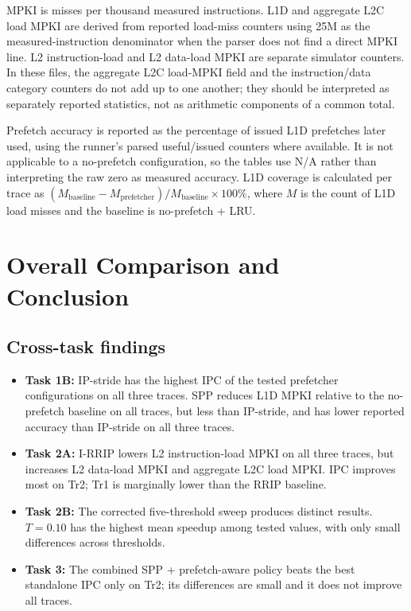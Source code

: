 \documentclass[11pt]{article}
\begin{document}
MPKI is misses per thousand measured instructions. L1D and aggregate L2C load MPKI are derived from reported load-miss counters using 25M as the measured-instruction denominator when the parser does not find a direct MPKI line. L2 instruction-load and L2 data-load MPKI are separate simulator counters. In these files, the aggregate L2C load-MPKI field and the instruction/data category counters do not add up to one another; they should be interpreted as separately reported statistics, not as arithmetic components of a common total.

Prefetch accuracy is reported as the percentage of issued L1D prefetches later used, using the runner's parsed useful/issued counters where available. It is not applicable to a no-prefetch configuration, so the tables use N/A rather than interpreting the raw zero as measured accuracy. L1D coverage is calculated per trace as $(M_{\mathrm{baseline}}-M_{\mathrm{prefetcher}})/M_{\mathrm{baseline}}\times100\%$, where $M$ is the count of L1D load misses and the baseline is no-prefetch + LRU.

\newpage
\newpage
\newpage
\newpage
\newpage
\newpage
\section{Overall Comparison and Conclusion}
\subsection{Cross-task findings}
\begin{itemize}
\item \textbf{Task 1B:} IP-stride has the highest IPC of the tested prefetcher configurations on all three traces. SPP reduces L1D MPKI relative to the no-prefetch baseline on all traces, but less than IP-stride, and has lower reported accuracy than IP-stride on all three traces.
\item \textbf{Task 2A:} I-RRIP lowers L2 instruction-load MPKI on all three traces, but increases L2 data-load MPKI and aggregate L2C load MPKI. IPC improves most on Tr2; Tr1 is marginally lower than the RRIP baseline.
\item \textbf{Task 2B:} The corrected five-threshold sweep produces distinct results. $T=0.10$ has the highest mean speedup among tested values, with only small differences across thresholds.
\item \textbf{Task 3:} The combined SPP + prefetch-aware policy beats the best standalone IPC only on Tr2; its differences are small and it does not improve all traces.
\end{itemize}
\end{document}
